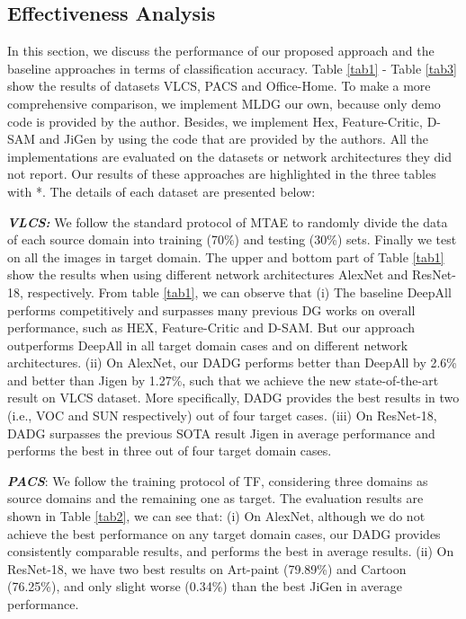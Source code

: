 \documentclass[twocolumn,preprint]{elsarticle}
\begin{document}
\subsection{Effectiveness Analysis} \label{sub:results}
In this section, we discuss the performance of our proposed approach and the baseline approaches in terms of classification accuracy. Table \ref{tab1} - Table \ref{tab3} show the results of datasets VLCS, PACS and Office-Home. To make a more comprehensive comparison, we implement MLDG our own, because only demo code is provided by the author. Besides, we implement Hex, Feature-Critic, D-SAM and JiGen by using the code that are provided by the authors. All the implementations are evaluated on the datasets or network architectures they did not report. Our results of these approaches are highlighted in the three tables with *. The details of each dataset are presented below:

\textit{\textbf{VLCS:}} We follow the standard protocol of MTAE \cite{mtae} to randomly divide the data of each source domain into training (70\%) and testing (30\%) sets. Finally we test on all the images in target domain. The upper and bottom part of Table \ref{tab1} show the results when using different network architectures AlexNet and ResNet-18, respectively. 
From table \ref{tab1}, we can observe that 
(i) The baseline DeepAll performs competitively and surpasses many previous DG works on overall performance, such as HEX, Feature-Critic and D-SAM. But our approach outperforms DeepAll in all target domain cases and on different network architectures.
(ii) On AlexNet, our DADG performs better than DeepAll by 2.6\% and better than Jigen by 1.27\%, such that we achieve the new state-of-the-art result on VLCS dataset. More specifically, DADG provides the best results in two (i.e., VOC and SUN respectively) out of four target cases. 
(iii) On ResNet-18, DADG surpasses the previous SOTA result Jigen in average performance and performs the best in three out of four target domain cases. 


\textit{\textbf{PACS}}: We follow the training protocol of TF, considering three domains as source domains and the remaining one as target. The evaluation results are shown in Table \ref{tab2}, we can see that: 
(i) On AlexNet, although we do not achieve the best performance on any target domain cases, our DADG provides consistently comparable results, and performs the  best in average results.
(ii) On ResNet-18, we have two best results on Art-paint (79.89\%) and Cartoon (76.25\%), and only slight worse (0.34\%) than the best JiGen in average performance.
\end{document}
